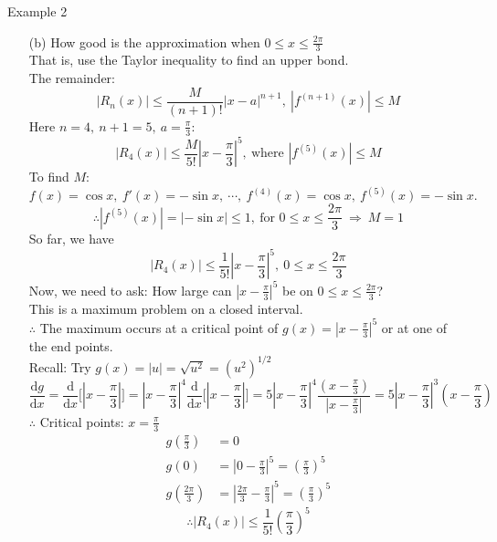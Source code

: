 \documentclass[12pt,a4paper]{article}
\def\d{{\mathrm{d}}}
\def\dx{\d x}
\begin{document}
\begin{eg}{Example 2}
\begin{enumerate}
		\item[(b)] How good is the approximation when $\displaystyle 0\leq x\leq\frac{2\pi}{3}$\\
		That is, use the Taylor inequality to find an upper bond. \\
		The remainder: $$|R_n(x)|\leq\frac{M}{(n+1)!}|x-a|^{n+1},\ |f^{(n+1)}(x)|\leq M$$
		Here $\displaystyle n=4,\ n+1=5,\ a=\frac{\pi}{3}$: 
		$$|R_4(x)|\leq\frac{M}{5!}\left|x-\frac{\pi}{3}\right|^5,\ \text{where }|f^{(5)}(x)|\leq M$$
		To find $M$: 
		$$f(x)=\cos{x},\ f'(x)=-\sin{x},\ \cdots,\ f^{(4)}(x)=\cos{x},\ f^{(5)}(x)=-\sin{x}.$$
		$$\therefore |f^{(5)}(x)|=|-\sin{x}|\leq1,\ \text{for }0\leq x\leq\frac{2\pi}{3}\ \Rightarrow\ M=1$$
		So far, we have $$|R_4(x)|\leq\frac{1}{5!}\left|x-\frac{\pi}{3}\right|^5,\ 0\leq x\leq\frac{2\pi}{3}$$
		Now, we need to ask: How large can $\displaystyle\left|x-\frac{\pi}{3}\right|^5$ be on $\displaystyle 0\leq x\leq\frac{2\pi}{3}$? \\
		This is a maximum problem on a closed interval. \\
		$\therefore$ The maximum occurs at a critical point of $\displaystyle g(x)=\left|x-\frac{\pi}{3}\right|^5$ or at one of the end points. \\
		Recall: Try $g(x)=|u|=\sqrt{u^2}=(u^2)^{1/2}$
		$$\frac{\d g}{\dx}=\frac{\d}{\dx}\bigg[\left|x-\frac{\pi}{3}\right|\bigg]=\left|x-\frac{\pi}{3}\right|^4\frac{\d}{\dx}\bigg[\left|x-\frac{\pi}{3}\right|\bigg]=5\left|x-\frac{\pi}{3}\right|^4\frac{(x-\frac{\pi}{3})}{\left|x-\frac{\pi}{3}\right|}=5\left|x-\frac{\pi}{3}\right|^3\left(x-\frac{\pi}{3}\right)$$
		$\therefore$ Critical points: $\displaystyle x=\frac{\pi}{3}$\\
		$$\begin{aligned}
			g\left(\frac{\pi}{3}\right)&=0\\
			g(0)&=\left|0-\frac{\pi}{3}\right|^5=\left(\frac{\pi}{3}\right)^5\\
			g\left(\frac{2\pi}{3}\right)&=\left|\frac{2\pi}{3}-\frac{\pi}{3}\right|^5=\left(\frac{\pi}{3}\right)^5
		\end{aligned}$$
		$$\therefore |R_4(x)|\leq\frac{1}{5!}\left(\frac{\pi}{3}\right)^5$$
	\end{enumerate}	
\end{eg}
\end{document}
